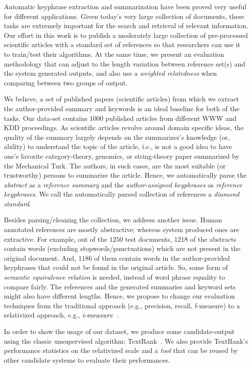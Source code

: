 \documentclass[a4paper]{report}
\begin{document}
\par Automatic keyphrase extraction and summarization have been proved very useful for different applications. Given today's very large collection of documents, these tasks are extremely important for the search and retrieval of relevant information. Our effort in this work is to publish a moderately large collection of pre-processed scientific articles with a standard set of references so that researchers can use it to train/test their algorithms. At the same time, we present an evaluation methodology that can adjust to the length variation between reference set(s) and the system generated outputs, and also use a \emph{weighted relatedness} when comparing between two groups of output.
\par We believe, a set of published papers (scientific articles) from which we extract the author-provided summary and keywords is an ideal baseline  for both of the tasks. Our data-set contains $1000$ published articles from different WWW and KDD proceedings. As scientific articles revolve around domain specific ideas, the quality of the summary largely depends on the summarizer's knowledge (or, ability) to understand the topic of the article, i.e., is not a good idea to have one's favorite category-theory, genomics, or string-theory paper summarized by the Mechanical Turk.  The authors, in such cases, are the most suitable (or trustworthy) persons to summarize the article. Hence, we automatically parse the \emph{abstract} as a \emph{reference summary} and the \emph{author-assigned keyphrases} as \emph{reference keyphrases}. We call the automatically parsed collection of references a \emph{diamond standard}. 
\par Besides parsing/cleaning the collection, we address another issue. Human annotated references are mostly abstractive; whereas system produced ones are extractive. For example,  out of the $1250$ test documents,  $1218$ of the abstracts contain  words (excluding stopwords/punctuations) which are not present in the original document. And, $1186$ of them contain  words in the author-provided keyphrases that could not be found in the original article. So, some form of \emph{semantic equivalence relation} is needed, instead of word phrase equality to compare  fairly. The references and the generated summaries
and keyword sets might also have different lengths. 
Hence, we propose to change our evaluation techniques from the traditional approach 
(e.g., precision, recall, f-measure) to a relativized approach, e.g., $i\hbox{-}measure$~\cite{DBLP:conf/ecir/HamidHT16}. 
\par In order to show the usage of our dataset, we produce some candidate-output using the classic unsupervised algorithm: TextRank~\cite{Mihalcea04TextRank}. We also provide TextRank's performance statistics on the relativized scale and a \emph{tool} that can be reused by other candidate systems to evaluate their performances.
\end{document}

